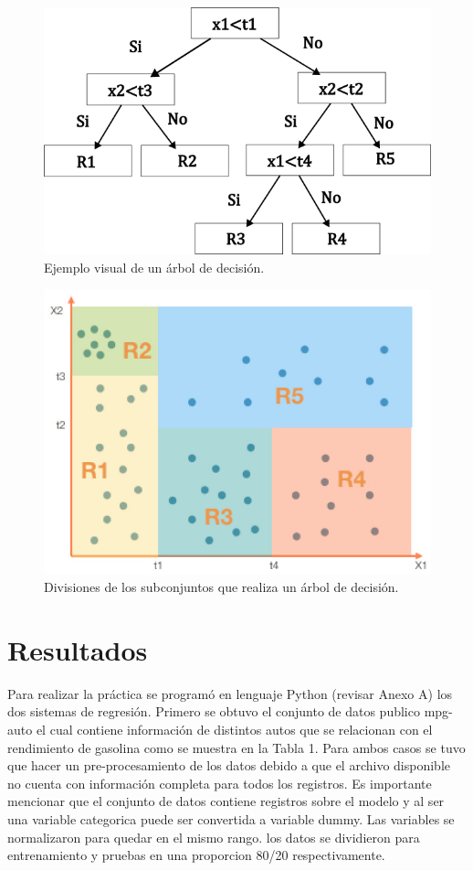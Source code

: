 \documentclass[conference]{IEEEtran}
\begin{document}
\begin{figure}[h]
    \centering
    \includegraphics[scale=0.5]{2.png}
    \caption{Ejemplo visual de un árbol de decisión.}
    \label{fig:mesh1}
\end{figure}

\begin{figure}[h]
    \centering
    \includegraphics[scale=0.6]{3.jpg}
    \caption{Divisiones de los subconjuntos que realiza un árbol de decisión.}
    \label{fig:mesh1}
\end{figure}

\section{Resultados}
Para realizar la práctica se programó en lenguaje Python (revisar Anexo A) los dos sistemas de regresión. Primero se obtuvo el conjunto de datos publico mpg-auto el cual contiene información de distintos autos que se relacionan con el rendimiento de gasolina como se muestra en la Tabla 1. Para ambos casos se tuvo que hacer un pre-procesamiento de los datos debido a que el archivo disponible no cuenta con información completa para todos los registros. Es importante mencionar que el conjunto de datos contiene registros sobre el modelo y al ser una variable categorica puede ser convertida a variable dummy. Las variables se normalizaron para quedar en el mismo rango. los datos se dividieron para entrenamiento y pruebas en una proporcion 80/20 respectivamente.
\end{document}
